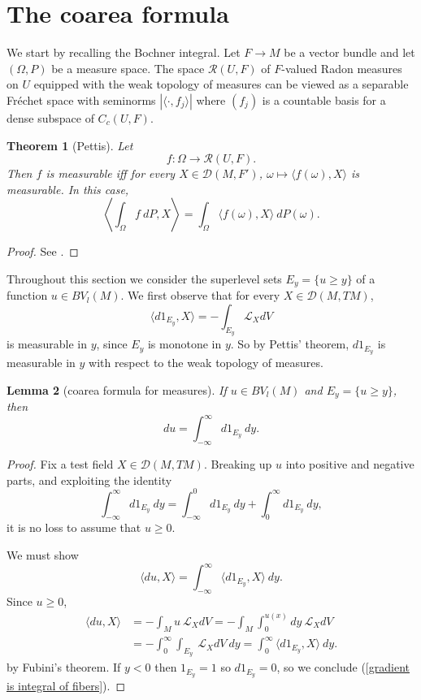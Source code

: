 \documentclass[reqno,12pt,letterpaper]{amsart}
\newtheorem{theorem}{Theorem}[section]
\newtheorem{lemma}[theorem]{Lemma}
\theoremstyle{definition}
\numberwithin{equation}{section}
\begin{document}

\appendix \section{The coarea formula} \label{coarea section}
We start by recalling the Bochner integral.
Let $F \to M$ be a vector bundle and let $(\Omega, P)$ be a measure space.
The space $\mathcal R(U, F)$ of $F$-valued Radon measures on $U$ equipped with the weak topology of measures can be viewed as a separable Fr\'echet space with seminorms $|\langle \cdot, f_j\rangle|$ where $(f_j)$ is a countable basis for a dense subspace of $C_c(U, F)$.

\begin{theorem}[Pettis]
Let
$$f: \Omega \to \mathcal R(U, F).$$
Then $f$ is measurable iff for every $X \in \mathcal D(M, F')$, $\omega \mapsto \langle f(\omega), X\rangle$ is measurable.
In this case,
$$\left\langle \int_\Omega f ~dP, X\right\rangle = \int_\Omega \langle f(\omega), X\rangle ~dP(\omega).$$
\end{theorem}
\begin{proof}
See \cite[Chapter V]{yosida2012functional}.
\end{proof}

Throughout this section we consider the superlevel sets $E_y = \{u \geq y\}$ of a function $u \in BV_l(M)$.
We first observe that for every $X \in \mathcal D(M, TM)$,
$$\langle d1_{E_y}, X\rangle = -\int_{E_y} \mathcal L_XdV$$
is measurable in $y$, since $E_y$ is monotone in $y$.
So by Pettis' theorem, $d1_{E_y}$ is measurable in $y$ with respect to the weak topology of measures.

\begin{lemma}[coarea formula for measures]\label{Coarea1}
If $u \in BV_l(M)$ and $E_y = \{u \geq y\}$, then
$$du = \int_{-\infty}^\infty d1_{E_y} ~dy.$$
\end{lemma}
\begin{proof}
Fix a test field $X \in \mathcal D(M, TM)$.
Breaking up $u$ into positive and negative parts, and exploiting the identity
$$\int_{-\infty}^\infty d1_{E_y} ~dy = \int_{-\infty}^0 d1_{E_y} ~dy + \int_0^\infty d1_{E_y} ~dy,$$
it is no loss to assume that $u \geq 0$.

We must show
\begin{equation}
\label{gradient is integral of fibers}
\langle du, X\rangle = \int_{-\infty}^\infty \langle d1_{E_y}, X\rangle ~dy.
\end{equation}
Since $u \geq 0$,
\begin{align*}
\langle du, X\rangle &= -\int_M u~\mathcal L_XdV = -\int_M \int_0^{u(x)} dy ~\mathcal L_XdV\\
&= -\int_0^\infty \int_{E_y} ~\mathcal L_XdV ~dy = \int_0^\infty \langle d1_{E_y}, X\rangle ~dy.
\end{align*}
by Fubini's theorem.
If $y < 0$ then $1_{E_y} = 1$ so $d1_{E_y} = 0$, so we conclude (\ref{gradient is integral of fibers}).
\end{proof}
\end{document}
